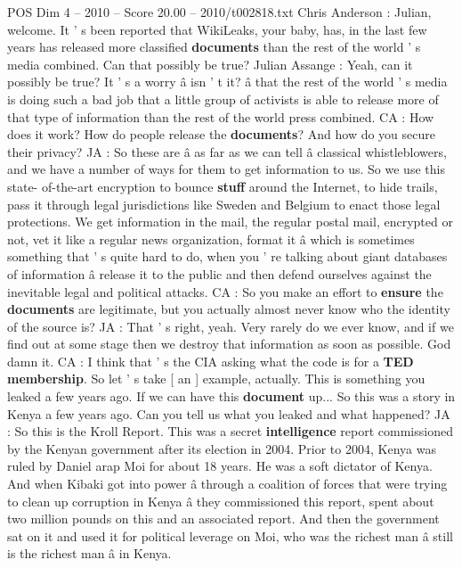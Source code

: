 \begin{textsample}{POS Dim 4 – 2010 – Score 20.00 – 2010/t002818.txt}  \label{ex:f4_pos_061}
Chris Anderson : Julian, welcome.
It ' s been reported that WikiLeaks, your baby, has, in the last few years has released more classified \textbf{documents} than the rest of the world ' s media combined.
Can that possibly be true?
Julian Assange : Yeah, can it possibly be true?
It ' s a worry â isn ' t it? â that the rest of the world ' s media is doing such a bad job that a little group of activists is able to release more of that type of information than the rest of the world press combined.
CA : How does it work?
How do people release the \textbf{documents}?
And how do you secure their privacy?
JA : So these are â as far as we can tell â classical whistleblowers, and we have a number of ways for them to get information to us.
So we use this state- of-the-art encryption to bounce \textbf{stuff} around the Internet, to hide trails, pass it through legal jurisdictions like Sweden and Belgium to enact those legal protections.
We get information in the mail, the regular postal mail, encrypted or not, vet it like a regular news organization, format it â which is sometimes something that ' s quite hard to do, when you ' re talking about giant databases of information â release it to the public and then defend ourselves against the inevitable legal and political attacks.
CA : So you make an effort to \textbf{ensure} the \textbf{documents} are legitimate, but you actually almost never know who the identity of the source is?
JA : That ' s right, yeah.
Very rarely do we ever know, and if we find out at some stage then we destroy that information as soon as possible.
God damn it.
CA : I think that ' s the CIA asking what the code is for a \textbf{TED} \textbf{membership}.
So let ' s take [ an ] example, actually.
This is something you leaked a few years ago.
If we can have this \textbf{document} up...
So this was a story in Kenya a few years ago.
Can you tell us what you leaked and what happened?
JA : So this is the Kroll Report.
This was a secret \textbf{intelligence} report commissioned by the Kenyan government after its election in 2004.
Prior to 2004, Kenya was ruled by Daniel arap Moi for about 18 years.
He was a soft dictator of Kenya.
And when Kibaki got into power â through a coalition of forces that were trying to clean up corruption in Kenya â they commissioned this report, spent about two million pounds on this and an associated report.
And then the government sat on it and used it for political leverage on Moi, who was the richest man â still is the richest man â in Kenya.

\end{textsample}
